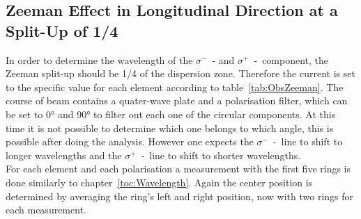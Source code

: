 \subsection{Zeeman Effect in Longitudinal Direction at a Split-Up of 1/4}
\label{toc:ZeemanEffecAnalysis}
In order to determine the wavelength of the $\sigma^-$~- and $\sigma^+$~-~component, the Zeeman split-up should be 1/4 of the dispersion zone. 
Therefore the current is set to the specific value for each element according to table~\ref{tab:ObsZeeman}. 
The course of beam contains a quater-wave plate and a polarisation filter, which can be set to \ang{0} and \ang{90} to filter out each one of the circular components. 
At this time it is not possible to determine which one belongs to which angle, this is possible after doing the analysis.
However one expects the $\sigma^-$~-~line to shift to longer wavelengths and the $\sigma^+$~-~line to shift to shorter wavelengths.\\
For each element and each polarisation a measurement with the first five rings is done similarly to chapter~\ref{toc:Wavelength}. 
Again the center position is determined by averaging the ring's left and right position, now with two rings for each measurement.


